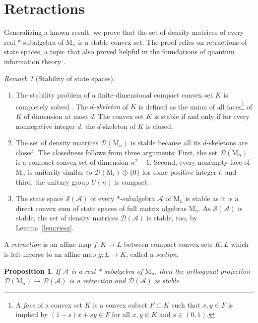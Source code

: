 \documentclass[a4paper,11pt,reqno]{amsart}
\newcommand{\M}{\mathrm{M}}
\newcommand{\cA}{\mathcal{A}}
\newcommand{\cD}{\mathcal{D}}
\newcommand{\cS}{\mathcal{S}}
\newtheorem{prop}[thm]{Proposition}
\theoremstyle{definition}
\theoremstyle{remark}
\newtheorem{rem}[thm]{Remark}
\numberwithin{equation}{section}
\begin{document}
\section{Retractions}
\label{sec:retraction}
%
Generalizing a known result, we prove that the set of density matrices of 
every real *-subalgebra of $\M_n$ is a stable convex set. The proof relies 
on retractions of state spaces, a topic that also proved helpful in the 
foundations of quantum information theory \cite{Harremoes2018}. 
\par
%
\begin{rem}[Stability of state spaces]\label{rem:Dstable}~
\begin{enumerate}
\item[a)]
The stability problem of a finite-dimensional compact convex set $K$ is 
completely solved \cite{Papadopoulou1977}. The \emph{$d$-skeleton} of $K$
is defined as the union of all faces\footnote{%
A \emph{face} \cite{Rockafellar1970} of a convex set $K$ is a convex subset 
$F\subset K$ such that $x,y\in F$ is implied by $(1-s)x + sy\in F$ for all
$x,y\in K$ and $s\in(0,1)$.}  
of $K$ of dimension at most $d$. The convex set $K$ is stable if and only 
if for every nonnegative integer $d$, the $d$-skeleton of $K$ is closed.
%
\item[b)]
The set of density matrices $\cD(\M_n)$ is stable \cite{Debs1979} because all 
its $d$-skeletons are closed. The closedness follows from three arguments: First,
the set $\cD(\M_n)$ is a compact convex set of dimension $n^2-1$. Second, every 
nonempty face of $\M_n$ is unitarily similar to $\cD(\M_l)\oplus\{0\}$ for some 
positive integer $l$, and third, the unitary group $U(n)$ is compact. 
%
\item[c)]
The state space $\cS(\cA)$ of every *-subalgebra $\cA$ of $\M_n$ is stable 
\cite{Papadopoulou1982} as it is a direct convex sum of state spaces of full
matrix algebras $\M_n$. As $\cS(\cA)$ is stable, the set of density matrices 
$\cD(\cA)$ is stable, too, by Lemma~\ref{lem:riesz}.
\end{enumerate}
\end{rem}
%
A \emph{retraction} is an affine map $f:K\to L$ between compact convex sets 
$K,L$ which is left-inverse to an affine map $g:L\to K$, called a 
\emph{section}. 
\par
%
\begin{prop}\label{pro:Astable}
If $\cA$ is a real *-subalgebra of $\M_n$, then the orthogonal 
projection $\cD(\M_n)\to\cD(\cA)$ is a retraction and 
$\cD(\cA)$ is stable.
\end{prop}
\end{document}
